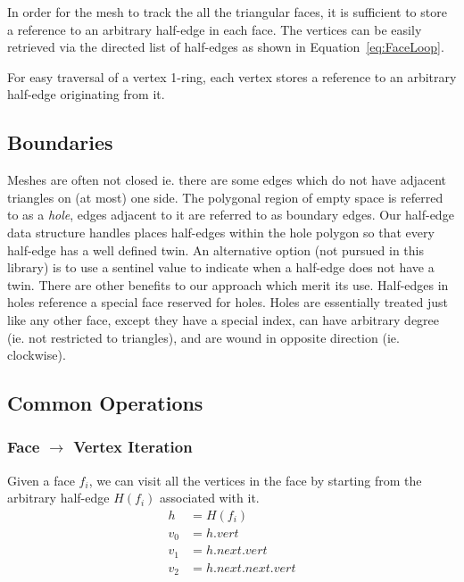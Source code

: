 \documentclass{article}
\begin{document}
In order for the mesh to track the all the triangular faces, it is sufficient to store a reference to an arbitrary half-edge in each face. The vertices can be easily retrieved via the directed list of half-edges as shown in Equation~\eqref{eq:FaceLoop}.

For easy traversal of a vertex 1-ring, each vertex stores a reference to an arbitrary half-edge originating from it.

\subsection{Boundaries}
Meshes are often not closed ie. there are some edges which do not have adjacent triangles on (at most) one side. The polygonal region of empty space is referred to as a {\it hole}, edges adjacent to it are referred to as boundary edges. Our half-edge data structure handles places half-edges within the hole polygon so that every half-edge has a well defined twin. An alternative option (not pursued in this library) is to use a sentinel value to indicate when a half-edge does not have a twin. There are other benefits to our approach which merit its use. Half-edges in holes reference a special face reserved for holes. Holes are essentially treated just like any other face, except they have a special index, can have arbitrary degree (ie. not restricted to triangles), and are wound in opposite direction (ie. clockwise).

\subsection{Common Operations}
\subsubsection{Face $\to$ Vertex Iteration}
Given a face $f_i$, we can visit all the vertices in the face by starting from the arbitrary half-edge $H(f_i)$ associated with it.
\begin{equation}
\begin{aligned}
h &= H(f_i) \\
v_0 &= h.vert \\
v_1 &= h.next.vert \\
v_2 &= h.next.next.vert
\end{aligned} \label{eq:FaceVertIteration}
\end{equation}
\end{document}
